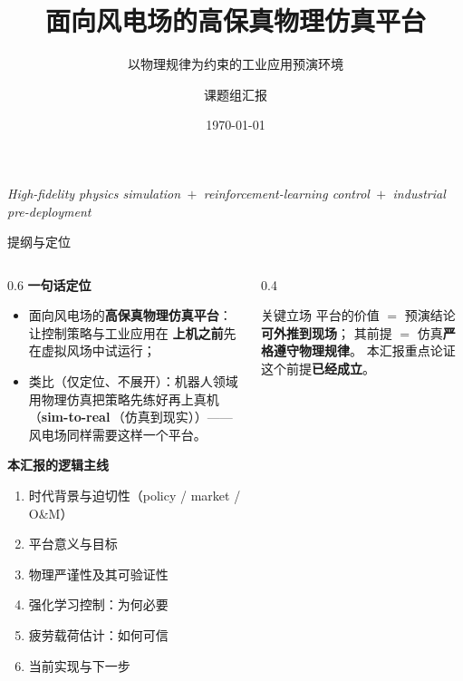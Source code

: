 \documentclass[aspectratio=169,10pt,UTF8]{ctexbeamer}
\title[风电场高保真物理仿真平台]{面向风电场的高保真物理仿真平台}
\subtitle{以物理规律为约束的工业应用预演环境}
\author{课题组汇报}
\date{\today}
\newcommand{\hl}[1]{{\color{myblue}\bfseries #1}}
\newcommand{\hlr}[1]{{\color{myred}\bfseries #1}}
\newcommand{\term}[2]{\textbf{#1}\,（#2）}
\begin{document}
\begin{frame}[plain]
  \titlepage
  \begin{center}
    \small\itshape
    High-fidelity physics simulation \,$+$\, reinforcement-learning control
    \,$+$\, industrial pre-deployment
  \end{center}
\end{frame}

\begin{frame}{提纲与定位}
  \begin{columns}[T]
    \begin{column}{0.6\textwidth}
      \textbf{一句话定位}
      \begin{itemize}\small
        \item 面向风电场的\hl{高保真物理仿真平台}：让控制策略与工业应用在
              \textbf{上机之前}先在虚拟风场中试运行；
        \item 类比（仅定位、不展开）：机器人领域用物理仿真把策略先练好再上真机
              （\term{sim-to-real}{仿真到现实}）——风电场同样需要这样一个平台。
      \end{itemize}
      \vspace{0.4em}
      \textbf{本汇报的逻辑主线}
      \begin{enumerate}\small
        \item 时代背景与迫切性（policy / market / O\&M）
        \item 平台意义与目标
        \item 物理严谨性及其可验证性
        \item 强化学习控制：为何必要
        \item 疲劳载荷估计：如何可信
        \item 当前实现与下一步
      \end{enumerate}
    \end{column}
    \begin{column}{0.4\textwidth}
      \begin{block}{关键立场}
        \small 平台的价值 $=$ 预演结论\hlr{可外推到现场}；
        其前提 $=$ 仿真\hl{严格遵守物理规律}。
        本汇报重点论证这个前提\textbf{已经成立}。
      \end{block}
    \end{column}
  \end{columns}
\end{frame}
\end{document}
